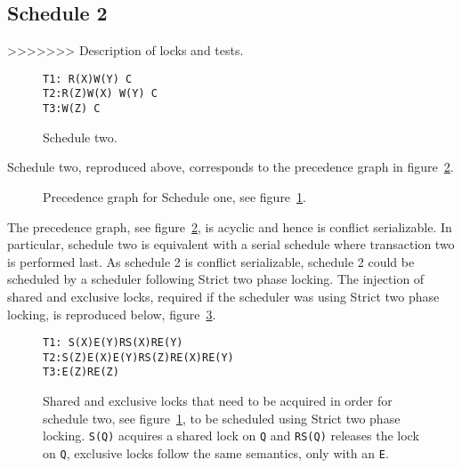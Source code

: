 \documentclass[12pt]{article}
\begin{document}
\subsection*{Schedule 2}
>>>>>>> Description of locks and tests.
\begin{figure}[h!]
\texttt{T1: R(X)\hspace{150pt}W(Y) C\\
T2:\hspace{130pt}R(Z)\hspace{120pt}W(X) W(Y) C\\
T3:\hspace{50pt}W(Z) C}
\caption{Schedule two.}
\label{sch2}
\end{figure}
Schedule two, reproduced above, corresponds to the precedence graph in figure~\ref{p2}.
\begin{figure}[h!]
\centering
{}
\caption{Precedence graph for Schedule one, see figure~\ref{sch2}.}
\label{p2}
\end{figure}
The precedence graph, see figure~\ref{p2}, is acyclic and hence is conflict serializable. In particular, schedule two is equivalent with a serial schedule where transaction two is performed last. As schedule 2 is conflict serializable, schedule 2 could be scheduled by a scheduler following Strict two phase locking. The injection of shared and exclusive locks, required if the scheduler was using Strict two phase locking, is reproduced below, figure~\ref{locks}.
\begin{figure}[h!]
\texttt{T1: S(X)\hspace{95pt}E(Y)RS(X)RE(Y)\\
T2:\hspace{105pt}S(Z)\hspace{90pt}E(X)E(Y)RS(Z)RE(X)RE(Y)\\
T3:\hspace{50pt}E(Z)RE(Z)}
\label{locks}
\caption{Shared and exclusive locks that need to be acquired in order for schedule two, see figure~\ref{sch2}, to be scheduled using Strict two phase locking. \texttt{S(Q)} acquires a shared lock on \texttt{Q} and \texttt{RS(Q)} releases the lock on \texttt{Q}, exclusive locks follow the same semantics, only with an \texttt{E}.}
\end{figure}
\end{document}
